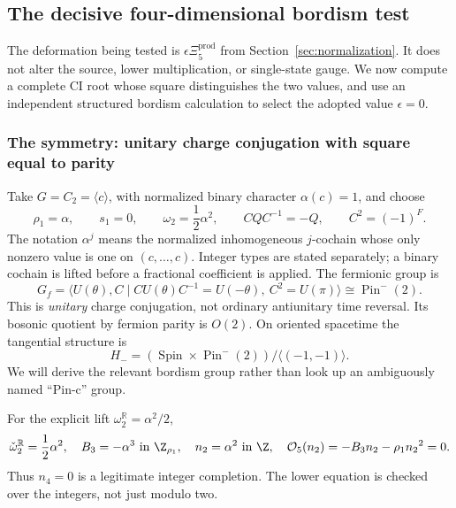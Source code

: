 \subsection{The decisive four-dimensional bordism test}\label{subsec:decisive-bordism}\label{sec:bordism06}
The deformation being tested is $\epsilon\Xi_5^{\mathrm{prod}}$ from Section~\ref{sec:normalization}. It does not alter the source, lower multiplication, or single-state gauge. We now compute a complete CI root whose square distinguishes the two values, and use an independent structured bordism calculation to select the adopted value $\epsilon=0$.
\subsubsection{The symmetry: unitary charge conjugation with square equal to parity}
Take $G=C_2=\langle c\rangle$, with normalized binary character $\alpha(c)=1$, and choose
\begin{equation}\label{eq:Hminus-background06}
 {\rho_1}=\alpha,\qquad {s_1}=0,\qquad
 \omega_2=\frac12\alpha^2,\qquad
 CQC^{-1}=-Q,\qquad C^2=(-1)^F.
\end{equation}
The notation $\alpha^j$ means the normalized inhomogeneous $j$-cochain whose only nonzero value is one on $(c,\ldots,c)$. Integer types are stated separately; a binary cochain is lifted before a fractional coefficient is applied. The fermionic group is
\begin{equation}
 G_f=\langle U(\theta),C\mid C U(\theta)C^{-1}=U(-\theta),\ C^2=U(\pi)\rangle
      \cong\operatorname{Pin}^{-}(2).
\end{equation}
This is \emph{unitary} charge conjugation, not ordinary antiunitary time reversal. Its bosonic quotient by fermion parity is $O(2)$. On oriented spacetime the tangential structure is
\begin{equation}\label{eq:Hminus06}
 H_-=(\operatorname{Spin}\times\operatorname{Pin}^{-}(2))/\langle(-1,-1)\rangle.
\end{equation}
We will derive the relevant bordism group rather than look up an ambiguously named ``Pin-c'' group.

For the explicit lift $\omega_2^{\mathbb R}=\alpha^2/2$,
\begin{equation}\label{eq:C2-lower06}
 \check\omega_2^{\mathbb R}=\frac12\alpha^2,\quad B_3=-\alpha^3\ \text{in }\Z_{\rho_1},
 \quad n_2=\alpha^2\ \text{in }\Z,
 \quad \mathcal O_5({n_2})=-B_3{n_2}-{\rho_1}{n_2}^2=0.
\end{equation}
Thus $n_4=0$ is a legitimate integer completion. The lower equation is checked over the integers, not just modulo two.



